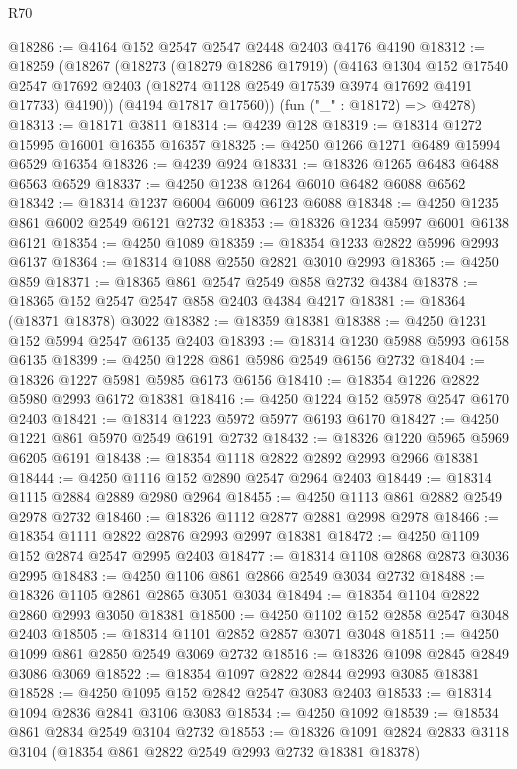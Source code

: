 \begin{lexlean}{R70}
\begin{coremodule}
@18286 := @4164 @152 @2547 @2547 @2448 @2403 @4176 @4190
@18312 := @18259
    (@18267
      (@18273
        (@18279 @18286 @17919)
        (@4163
          @1304
          @152
          @17540
          @2547
          @17692
          @2403
          (@18274 @1128 @2549 @17539 @3974 @17692 @4191 @17733)
          @4190))
      (@4194 @17817 @17560))
    (fun ("_" : @18172) => @4278)
@18313 := @18171 @3811
@18314 := @4239 @128
@18319 := @18314 @1272 @15995 @16001 @16355 @16357
@18325 := @4250 @1266 @1271 @6489 @15994 @6529 @16354
@18326 := @4239 @924
@18331 := @18326 @1265 @6483 @6488 @6563 @6529
@18337 := @4250 @1238 @1264 @6010 @6482 @6088 @6562
@18342 := @18314 @1237 @6004 @6009 @6123 @6088
@18348 := @4250 @1235 @861 @6002 @2549 @6121 @2732
@18353 := @18326 @1234 @5997 @6001 @6138 @6121
@18354 := @4250 @1089
@18359 := @18354 @1233 @2822 @5996 @2993 @6137
@18364 := @18314 @1088 @2550 @2821 @3010 @2993
@18365 := @4250 @859
@18371 := @18365 @861 @2547 @2549 @858 @2732 @4384
@18378 := @18365 @152 @2547 @2547 @858 @2403 @4384 @4217
@18381 := @18364 (@18371 @18378) @3022
@18382 := @18359 @18381
@18388 := @4250 @1231 @152 @5994 @2547 @6135 @2403
@18393 := @18314 @1230 @5988 @5993 @6158 @6135
@18399 := @4250 @1228 @861 @5986 @2549 @6156 @2732
@18404 := @18326 @1227 @5981 @5985 @6173 @6156
@18410 := @18354 @1226 @2822 @5980 @2993 @6172 @18381
@18416 := @4250 @1224 @152 @5978 @2547 @6170 @2403
@18421 := @18314 @1223 @5972 @5977 @6193 @6170
@18427 := @4250 @1221 @861 @5970 @2549 @6191 @2732
@18432 := @18326 @1220 @5965 @5969 @6205 @6191
@18438 := @18354 @1118 @2822 @2892 @2993 @2966 @18381
@18444 := @4250 @1116 @152 @2890 @2547 @2964 @2403
@18449 := @18314 @1115 @2884 @2889 @2980 @2964
@18455 := @4250 @1113 @861 @2882 @2549 @2978 @2732
@18460 := @18326 @1112 @2877 @2881 @2998 @2978
@18466 := @18354 @1111 @2822 @2876 @2993 @2997 @18381
@18472 := @4250 @1109 @152 @2874 @2547 @2995 @2403
@18477 := @18314 @1108 @2868 @2873 @3036 @2995
@18483 := @4250 @1106 @861 @2866 @2549 @3034 @2732
@18488 := @18326 @1105 @2861 @2865 @3051 @3034
@18494 := @18354 @1104 @2822 @2860 @2993 @3050 @18381
@18500 := @4250 @1102 @152 @2858 @2547 @3048 @2403
@18505 := @18314 @1101 @2852 @2857 @3071 @3048
@18511 := @4250 @1099 @861 @2850 @2549 @3069 @2732
@18516 := @18326 @1098 @2845 @2849 @3086 @3069
@18522 := @18354 @1097 @2822 @2844 @2993 @3085 @18381
@18528 := @4250 @1095 @152 @2842 @2547 @3083 @2403
@18533 := @18314 @1094 @2836 @2841 @3106 @3083
@18534 := @4250 @1092
@18539 := @18534 @861 @2834 @2549 @3104 @2732
@18553 := @18326
    @1091
    @2824
    @2833
    @3118
    @3104
    (@18354 @861 @2822 @2549 @2993 @2732 @18381 @18378)

\end{coremodule}
\end{lexlean}

